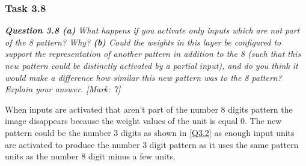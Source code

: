 \subsubsection{Task 3.8}
\label{Q1:Expl 3.4.2 (3.8) SubSubSection}

\begin{tcolorbox}[colback=gray!20!white,colframe=gray!20!white]
  \emph{\textbf{Question 3.8 (a)} What happens if you activate only inputs which are not part of the 8 pattern? Why? \textbf{(b)} Could the weights in this layer be configured to support the representation of another pattern in addition to the 8 (such that this new pattern could be distinctly activated by a partial input), and do you think it would make a difference how similar this new pattern was to the 8 pattern? Explain your answer. [Mark: 7]} 
\end{tcolorbox} 
\vspace{0.5cm}

When inputs are activated that aren't part of the number 8 digits pattern the image disappears because the weight values of the unit is equal 0. The new pattern could be the number 3 digits as shown in \cref{Q3.2} as enough input units are activated to produce the number 3 digit pattern as it uses the same pattern units as the number 8 digit minus a few units.